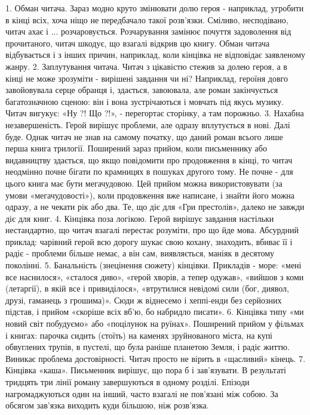 1. Обман читача.
Зараз модно круто змінювати долю героя - наприклад, угробити в кінці всіх, хоча ніщо не передбачало такої розв'язки. Сміливо, несподівано, читач ахає і ... розчаровується. Розчарування замінює почуття задоволення від прочитаного, читач шкодує, що взагалі відкрив цю книгу. Обман читача відбувається і з інших причин, наприклад, коли кінцівка не відповідає заявленому жанру.
2. Заплутування читача.
Читач з цікавістю стежив за долею героя, а в кінці не може зрозуміти - вирішені завдання чи ні? Наприклад, героїня довго завойовувала серце обранця і, здається, завоювала, але роман закінчується багатозначною сценою: він і вона зустрічаються і мовчать під якусь музику. Читач вигукує: «Ну ?! Що ?!», - перегортає сторінку, а там порожньо.
3. Нахабна незавершеність.
Герой вирішує проблеми, але одразу вплутується в нові. Далі буде. Однак читач не знав на самому початку, що даний роман всього лише перша книга трилогії. Поширений зараз прийом, коли письменнику або видавництву здається, що якщо повідомити про продовження в кінці, то читач неодмінно почне бігати по крамницях в пошуках другого тому. Не почне - для цього книга має бути мегачудовою. Цей прийом можна використовувати (за умови «мегачудовості»), коли продовження вже написане, і знайти його можна одразу, а не чекати рік або два. Те, що діє для «Гри престолів», далеко не завжди діє для книг.
4. Кінцівка поза логікою.
Герой вирішує завдання настільки нестандартно, що читач взагалі перестає розуміти, про що йде мова.
Абсурдний приклад: чарівний герой всю дорогу шукає свою кохану, знаходить, вбиває її і радіє - проблеми більше немає, а він сам, виявляється, маніяк в десятому поколінні.
5. Банальність (знецінення сюжету) кінцівки.
Прикладів - море: «мені все наснилося», «сталося диво», «герой хворів, а тепер одужав», «вийшов з коми (летаргії), в якій все і привиділося», «втрутилися невідомі сили (бог, диявол, друзі, гаманець з грошима)». Сюди ж віднесемо і хеппі-енди без серйозних підстав, і прийом «скоріше всіх вб'ю, бо набридло писати».
6. Кінцівка типу «ми новий світ побудуємо» або «поцілунок на руїнах».
Поширений прийом у фільмах і книгах: парочка сидить (стоїть) на каменях зруйнованого міста, на купі обвуглених трупів, в пустелі, що була раніше планетою Земля, і радіє життю. Виникає проблема достовірності. Читач просто не вірить в «щасливий» кінець.
7. Кінцівка «каша».
Письменник вирішує, що пора б і зав'язувати. В результаті тридцять три лінії роману завершуються в одному розділі. Епізоди нагромаджуються один на інший, часто взагалі не пов'язані між собою. За обсягом зав'язка  виходить куди більшою, ніж розв'язка.
